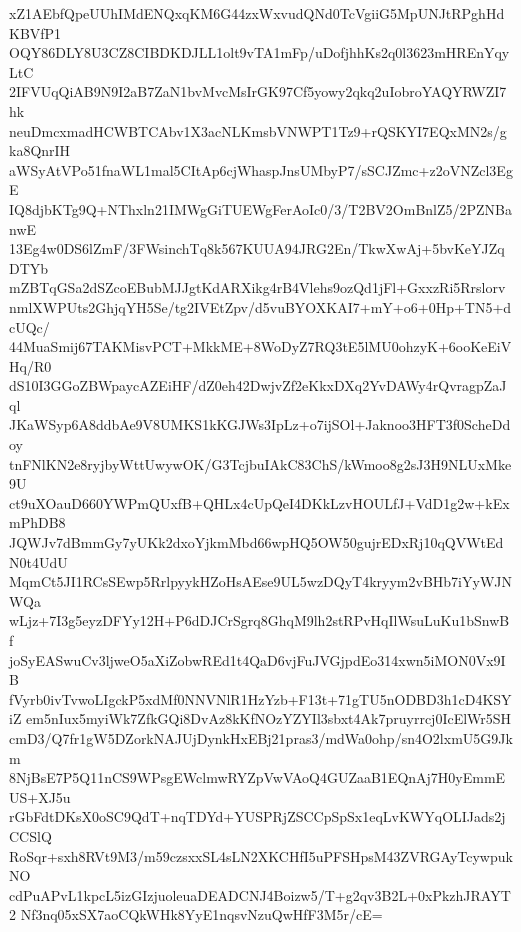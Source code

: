 xZ1AEbfQpeUUhIMdENQxqKM6G44zxWxvudQNd0TcVgiiG5MpUNJtRPghHdKBVfP1
OQY86DLY8U3CZ8CIBDKDJLL1olt9vTA1mFp/uDofjhhKs2q0l3623mHREnYqyLtC
2IFVUqQiAB9N9I2aB7ZaN1bvMvcMsIrGK97Cf5yowy2qkq2uIobroYAQYRWZI7hk
neuDmcxmadHCWBTCAbv1X3acNLKmsbVNWPT1Tz9+rQSKYI7EQxMN2s/gka8QnrIH
aWSyAtVPo51fnaWL1mal5CItAp6cjWhaspJnsUMbyP7/sSCJZmc+z2oVNZcl3EgE
IQ8djbKTg9Q+NThxln21IMWgGiTUEWgFerAoIc0/3/T2BV2OmBnlZ5/2PZNBanwE
13Eg4w0DS6lZmF/3FWsinchTq8k567KUUA94JRG2En/TkwXwAj+5bvKeYJZqDTYb
mZBTqGSa2dSZcoEBubMJJgtKdARXikg4rB4Vlehs9ozQd1jFl+GxxzRi5Rrslorv
nmlXWPUts2GhjqYH5Se/tg2IVEtZpv/d5vuBYOXKAI7+mY+o6+0Hp+TN5+dcUQc/
44MuaSmij67TAKMisvPCT+MkkME+8WoDyZ7RQ3tE5lMU0ohzyK+6ooKeEiVHq/R0
dS10I3GGoZBWpaycAZEiHF/dZ0eh42DwjvZf2eKkxDXq2YvDAWy4rQvragpZaJql
JKaWSyp6A8ddbAe9V8UMKS1kKGJWs3IpLz+o7ijSOl+Jaknoo3HFT3f0ScheDdoy
tnFNlKN2e8ryjbyWttUwywOK/G3TcjbuIAkC83ChS/kWmoo8g2sJ3H9NLUxMke9U
ct9uXOauD660YWPmQUxfB+QHLx4cUpQeI4DKkLzvHOULfJ+VdD1g2w+kExmPhDB8
JQWJv7dBmmGy7yUKk2dxoYjkmMbd66wpHQ5OW50gujrEDxRj10qQVWtEdN0t4UdU
MqmCt5JI1RCsSEwp5RrlpyykHZoHsAEse9UL5wzDQyT4kryym2vBHb7iYyWJNWQa
wLjz+7I3g5eyzDFYy12H+P6dDJCrSgrq8GhqM9lh2stRPvHqIlWsuLuKu1bSnwBf
joSyEASwuCv3ljweO5aXiZobwREd1t4QaD6vjFuJVGjpdEo314xwn5iMON0Vx9IB
fVyrb0ivTvwoLIgckP5xdMf0NNVNlR1HzYzb+F13t+71gTU5nODBD3h1cD4KSYiZ
em5nIux5myiWk7ZfkGQi8DvAz8kKfNOzYZYIl3sbxt4Ak7pruyrrcj0IcElWr5SH
cmD3/Q7fr1gW5DZorkNAJUjDynkHxEBj21pras3/mdWa0ohp/sn4O2lxmU5G9Jkm
8NjBsE7P5Q11nCS9WPsgEWclmwRYZpVwVAoQ4GUZaaB1EQnAj7H0yEmmEUS+XJ5u
rGbFdtDKsX0oSC9QdT+nqTDYd+YUSPRjZSCCpSpSx1eqLvKWYqOLIJads2jCCSlQ
RoSqr+sxh8RVt9M3/m59czsxxSL4sLN2XKCHfI5uPFSHpsM43ZVRGAyTcywpukNO
cdPuAPvL1kpcL5izGIzjuoleuaDEADCNJ4Boizw5/T+g2qv3B2L+0xPkzhJRAYT2
Nf3nq05xSX7aoCQkWHk8YyE1nqsvNzuQwHfF3M5r/cE=
